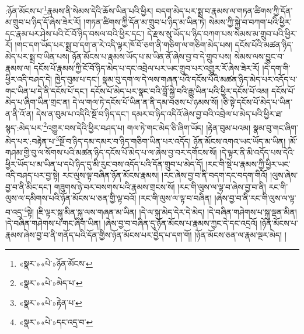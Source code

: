 :ཉོན་མོངས་པ་\footnote{«སྣར་»«པེ་»ཉོན་མོངས་}རྣམས་ནི་སེམས་དེའི་ཆོས་ཡིན་པའི་ཕྱིར། བདག་མེད་པར་སྨྲ་བ་རྣམས་ལ་གཏན་ཚིགས་ཀྱི་དོན་མ་གྲུབ་པ་ཉིད་དོ་ཞེས་ཟེར་རོ། །གཏན་ཚིགས་ཀྱི་དོན་མ་གྲུབ་པ་ཉིད་མ་ཡིན་ཏེ། སེམས་ཀྱི་སྐྱེ་བ་བཀག་པའི་ཕྱིར་དང་རྣམ་པར་ཤེས་པའི་ངོ་བོ་ཉིད་བསལ་བའི་ཕྱིར་དང་། དེ་རྫས་སུ་ཡོད་པ་ཉིད་བཀག་པས་སེམས་མ་གྲུབ་པའི་ཕྱིར་རོ། །གང་དག་ཡོད་པར་སྨྲ་བ་དག་ན་རེ་འདི་ལྟར་ཁོ་བོ་ཅག་ནི་གཅིག་ལ་གཅིག་མེད་པས། དངོས་པོའི་མཚན་ཉིད་མེད་པར་སྨྲ་བ་ཡིན་པས། ཉོན་མོངས་པ་རྣམས་ཡོད་པ་མ་ཡིན་ནོ་ཞེས་བྱ་བ་དེ་གྲུབ་པས། སེམས་ལས་བྱུང་བ་རྣམས་ལ། དངོས་པོ་རྣམས་ཀྱི་ངོ་བོ་ཉིད་མེད་པ་དང་འབྲེལ་པར་ཡང་གྲུབ་པར་འགྱུར་རོ་ཞེས་ཟེར་རོ། །དེ་དག་གི་ཕྱིར་འདི་བཤད་དེ། ཁྱེད་བུམ་པ་དང་། སྣམ་བུ་དག་ལ་དེ་ལས་གཞན་པའི་དངོས་པོའི་མཚན་ཉིད་མེད་པར་འདོད་པ་གང་ཡིན་པ་དེ་ནི་དངོས་པོ་དང་། དངོས་པོ་མེད་པར་སྣང་བའི་བློ་སྐྱེ་བའི་རྒྱུ་ཡིན་པའི་ཕྱིར་དངོས་པོ་འམ། དངོས་པོ་མེད་པ་ཞིག་ཡིན་གྲང་ན། དེ་ལ་གལ་ཏེ་དངོས་པོ་ཡིན་ན་ནི་དམ་བཅས་པ་ཉམས་སོ། །ཅི་སྟེ་དངོས་པོ་མེད་པ་ཡིན་ན་ནི་འོ་ན། དེས་ན་བུམ་པ་འདིའི་སྔོ་བ་ཉིད་དང་། དམར་བ་ཉིད་འདིའོ་ཞེས་བྱ་བའི་འབྲེལ་པ་མེད་པའི་ཕྱིར་ཐ་སྙད་:མེད་པར་\footnote{«སྣར་»«པེ་»མེད་པ་}འགྱུར་བས་དེའི་ཕྱིར་བཤད་པ། གལ་ཏེ་གང་མེད་ཅི་ཞིག་ཡོད། །རྟེན་བུམ་པའམ། སྣམ་བུ་གང་ཞིག་མེད་པར་:བརྟེན་པ་\footnote{«སྣར་»«པེ་»རྟེན་པ་}སྔོ་བ་ཉིད་དམ་དམར་བ་ཉིད་གཅིག་ཡིན་པར་འདོད། ཉོན་མོངས་འགའ་ཡང་ཡོད་མ་ཡིན། །མོ་གཤམ་གྱི་བུ་ལ་སོགས་པའི་མཚན་ཉིད་དངོས་པོ་མེད་པ་ལ་ཞེས་བྱ་བར་དགོངས་སོ། །དེ་ལྟར་ནི་མི་འདོད་པས་དེའི་ཕྱིར་ཡོད་པ་མ་ཡིན་པ་དཔེ་ཉིད་དུ་མི་རུང་བས་འདོད་པའི་དོན་གྲུབ་པ་མེད་དོ། །རང་གི་སྡེ་པ་རྣམས་ཀྱི་ཕྱིར་ཡང་འདི་བཤད་པར་བྱ་སྟེ། རང་ལུས་ལྟ་བཞིན་ཉོན་མོངས་རྣམས། །རང་ཞེས་བྱ་བ་ནི་བདག་དང་བདག་གིའོ། །ལུས་ཞེས་བྱ་བ་ནི་མིང་དང་། གཟུགས་ཉེ་བར་བསགས་པའི་རྣམས་གྲངས་སོ། །རང་གི་ལུས་ལ་ལྟ་བ་ཞེས་བྱ་བ་ནི། རང་གི་ལུས་ལ་དམིགས་པའི་ཉོན་མོངས་པ་ཅན་གྱི་ལྟ་བའོ། །རང་གི་ལུས་ལ་ལྟ་བ་བཞིན། །ཞེས་བྱ་བ་ནི་རང་གི་ལུས་ལ་ལྟ་བ་འདྲ་\footnote{«སྣར་»«པེ་»དང་འདྲ་བ་}སྟེ། །ཇི་ལྟར་སྐུ་མིན་སྐུ་ལས་གཞན་མ་ཡིན། །དེ་ལ་སྐུ་མེད་དེར་དེ་མེད། །དེ་བཞིན་གཤེགས་པ་སྐུ་ལྡན་མིན། །དེ་བཞིན་གཤེགས་པ་གང་ཞིག་ཡིན། །ཞེས་བྱ་བ་བཞིན་དུ་ཉོན་མོངས་པ་རྣམས་ཀྱང་དེ་དང་འདྲའོ། །ཉོན་མོངས་པ་རྣམས་ཞེས་བྱ་བ་ནི་གནོད་པའི་དོན་གྱིས་ཉོན་མོངས་པར་བྱེད་པ་དག་གོ། །ཉོན་མོངས་ཅན་ལ་རྣམ་ལྔར་མེད། །
